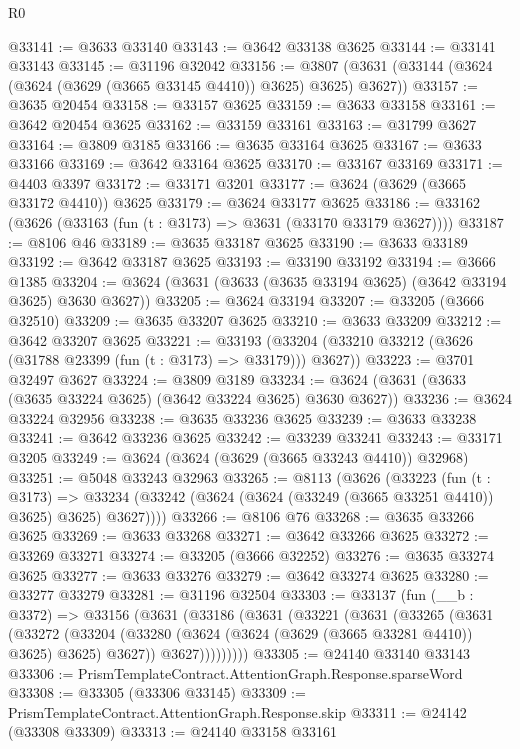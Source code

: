 \begin{lexlean}{R0}
\begin{coremodule}
@33141 := @3633 @33140
@33143 := @3642 @33138 @3625
@33144 := @33141 @33143
@33145 := @31196 @32042
@33156 := @3807 (@3631 (@33144 (@3624 (@3624 (@3629 (@3665 @33145 @4410)) @3625) @3625) @3627))
@33157 := @3635 @20454
@33158 := @33157 @3625
@33159 := @3633 @33158
@33161 := @3642 @20454 @3625
@33162 := @33159 @33161
@33163 := @31799 @3627
@33164 := @3809 @3185
@33166 := @3635 @33164 @3625
@33167 := @3633 @33166
@33169 := @3642 @33164 @3625
@33170 := @33167 @33169
@33171 := @4403 @3397
@33172 := @33171 @3201
@33177 := @3624 (@3629 (@3665 @33172 @4410)) @3625
@33179 := @3624 @33177 @3625
@33186 := @33162 (@3626 (@33163 (fun (t : @3173) => @3631 (@33170 @33179 @3627))))
@33187 := @8106 @46
@33189 := @3635 @33187 @3625
@33190 := @3633 @33189
@33192 := @3642 @33187 @3625
@33193 := @33190 @33192
@33194 := @3666 @1385
@33204 := @3624 (@3631 (@3633 (@3635 @33194 @3625) (@3642 @33194 @3625) @3630 @3627))
@33205 := @3624 @33194
@33207 := @33205 (@3666 @32510)
@33209 := @3635 @33207 @3625
@33210 := @3633 @33209
@33212 := @3642 @33207 @3625
@33221 := @33193 (@33204 (@33210 @33212 (@3626 (@31788 @23399 (fun (t : @3173) => @33179))) @3627))
@33223 := @3701 @32497 @3627
@33224 := @3809 @3189
@33234 := @3624 (@3631 (@3633 (@3635 @33224 @3625) (@3642 @33224 @3625) @3630 @3627))
@33236 := @3624 @33224 @32956
@33238 := @3635 @33236 @3625
@33239 := @3633 @33238
@33241 := @3642 @33236 @3625
@33242 := @33239 @33241
@33243 := @33171 @3205
@33249 := @3624 (@3624 (@3629 (@3665 @33243 @4410)) @32968)
@33251 := @5048 @33243 @32963
@33265 := @8113
    (@3626
      (@33223
        (fun (t : @3173) =>
        @33234 (@33242 (@3624 (@3624 (@33249 (@3665 @33251 @4410)) @3625) @3625) @3627))))
@33266 := @8106 @76
@33268 := @3635 @33266 @3625
@33269 := @3633 @33268
@33271 := @3642 @33266 @3625
@33272 := @33269 @33271
@33274 := @33205 (@3666 @32252)
@33276 := @3635 @33274 @3625
@33277 := @3633 @33276
@33279 := @3642 @33274 @3625
@33280 := @33277 @33279
@33281 := @31196 @32504
@33303 := @33137
    (fun (__b : @3372) =>
    @33156
      (@3631
        (@33186
          (@3631
            (@33221
              (@3631
                (@33265
                  (@3631
                    (@33272
                      (@33204
                        (@33280 (@3624 (@3624 (@3629 (@3665 @33281 @4410)) @3625) @3625) @3627))
                      @3627)))))))))
@33305 := @24140 @33140 @33143
@33306 := PrismTemplateContract.AttentionGraph.Response.sparseWord
@33308 := @33305 (@33306 @33145)
@33309 := PrismTemplateContract.AttentionGraph.Response.skip
@33311 := @24142 (@33308 @33309)
@33313 := @24140 @33158 @33161

\end{coremodule}
\end{lexlean}
